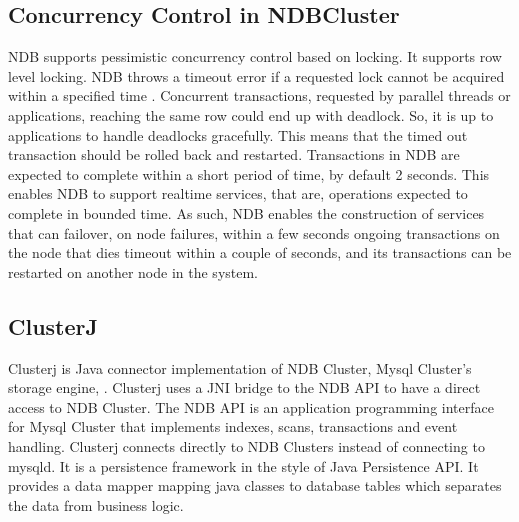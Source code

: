 \subsection{Concurrency Control in NDBCluster}
NDB  supports   pessimistic   concurrency   control  based  on  locking.  It  supports   row  level
locking.  NDB  throws   a timeout error if a requested lock  cannot be acquired within a specified
time \cite{mysql1}.  Concurrent  transactions,  requested  by   parallel  threads   or  applications,
reaching  the  same  row  could  end  up  with  deadlock.  So,  it  is   up  to  applications   to  handle
deadlocks   gracefully.  This   means   that  the  timed  out  transaction  should  be  rolled  back   and
restarted.  Transactions   in  NDB  are  expected  to  complete  within  a  short  period  of  time,  by
default  2  seconds.  This   enables   NDB  to  support  realtime  services,  that  are,  operations
expected  to  complete  in  bounded  time.  As   such,  NDB  enables   the  construction  of  services
that  can  failover,  on  node  failures,  within  a  few  seconds     ongoing transactions  on the node
that  dies  timeout within a couple of seconds, and its  transactions  can be restarted on another
node in the system.

\subsection{ClusterJ}
Clusterj  is   Java  connector  implementation  of  NDB  Cluster,  Mysql  Cluster’s   storage  engine, \cite{29}.  Clusterj  uses   a  JNI  bridge  to  the  NDB  API  to  have  a  direct  access   to  NDB
Cluster.  The  NDB  API  is   an  application  programming  interface  for  Mysql  Cluster  that
implements   indexes,  scans,  transactions   and  event  handling.  Clusterj  connects   directly   to
NDB  Clusters   instead  of  connecting  to  mysqld.  It  is   a  persistence  framework   in  the  style of
Java  Persistence  API.  It  provides   a  data  mapper  mapping  java  classes   to  database  tables
which separates the data from business logic.


